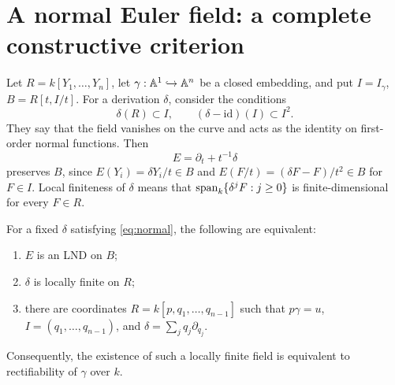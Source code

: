\section{A normal Euler field: a complete constructive criterion}
Let $R=k[Y_1,\ldots,Y_n]$, let $\gamma:{\mathbb{A}}^1\hookrightarrow{\mathbb{A}}^n$ be a closed embedding,
and put $I=I_\gamma$, $B=R[t,I/t]$. For a derivation $\delta$, consider
the conditions
\begin{equation}\label{eq:normal}
\delta(R)\subset I,\qquad (\delta-\mathrm{id})(I)\subset I^2.
\end{equation}
They say that the field vanishes on the curve and acts as the identity on
first-order normal functions. Then
\[
E=\partial_t+t^{-1}\delta
\]
preserves $B$, since $E(Y_i)=\delta Y_i/t\in B$ and
$E(F/t)=(\delta F-F)/t^2\in B$ for $F\in I$.
Local finiteness of $\delta$ means that
$\operatorname{span}_k\{\delta^jF:j\ge0\}$ is finite-dimensional for every $F\in R$.

\begin{theorem}\label{thm:euler}
For a fixed $\delta$ satisfying \eqref{eq:normal}, the following are equivalent:
\begin{enumerate}
\item $E$ is an LND on $B$;
\item $\delta$ is locally finite on $R$;
\item there are coordinates $R=k[p,q_1,\ldots,q_{n-1}]$ such that
$p\gamma=u$, $I=(q_1,\ldots,q_{n-1})$, and
$\delta=\sum_jq_j\partial_{q_j}$.
\end{enumerate}
Consequently, the existence of such a locally finite field is equivalent
to rectifiability of $\gamma$ over $k$.
\end{theorem}

